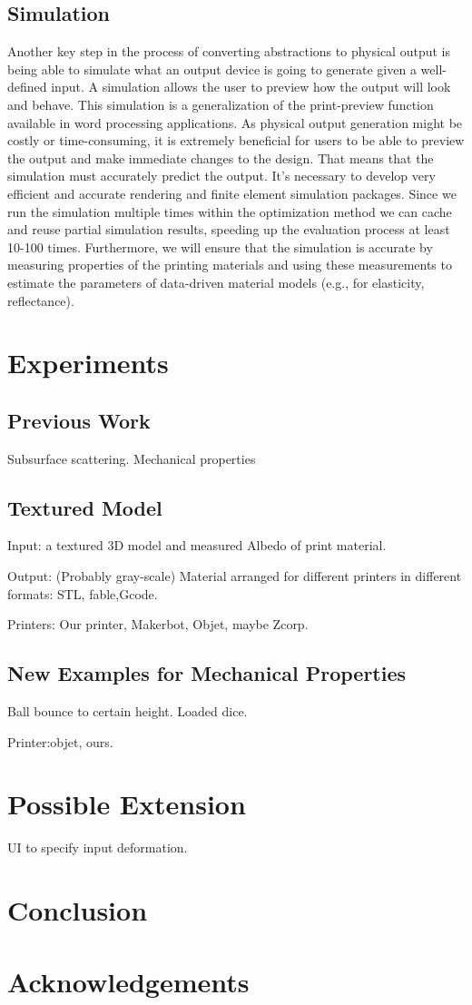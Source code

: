 \documentclass[annual]{acmsiggraph}
\begin{document}
\subsection{Simulation}
Another key step in the process of converting abstractions to physical output is being able to
simulate what an output device is going to generate given a well-defined input. A simulation allows the
user to preview how the output will look and behave. This simulation is a generalization of the print-preview function
available in word processing applications. As physical output generation might be costly or time-consuming, it
is extremely beneficial for users to be able to preview the output and make immediate changes to the design. That
means that the simulation must accurately predict the output. It's necessary to develop very efficient and accurate rendering
and finite element simulation packages. Since we run the simulation multiple times within the optimization method
we can cache and reuse partial simulation results, speeding up the evaluation process at least 10-100 times. Furthermore,
we will ensure that the simulation is accurate by measuring properties of the printing materials and using
these measurements to estimate the parameters of data-driven material models (e.g., for elasticity, reflectance).
\section{Experiments}
\subsection{Previous Work}
Subsurface scattering. Mechanical properties
\subsection{Textured Model}
Input: a textured 3D model and
	measured Albedo of print material.

Output: (Probably gray-scale) Material arranged for different printers in different formats: STL, fable,Gcode.

Printers: Our printer, Makerbot, Objet, maybe Zcorp.

\subsection{New Examples for Mechanical Properties}
Ball bounce to certain height. Loaded dice.

Printer:objet, ours.

\section{Possible Extension}
UI to specify input deformation.
\section{Conclusion}
\section*{Acknowledgements}



\end{document}
